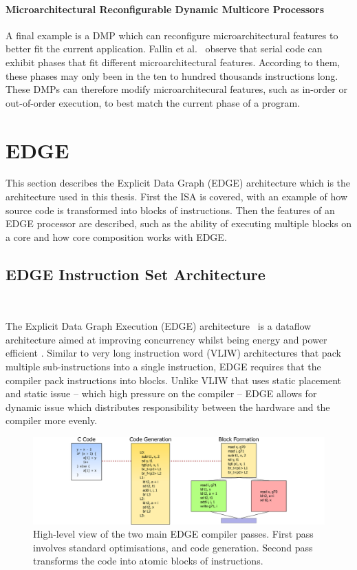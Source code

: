 \paragraph*{Microarchitectural Reconfigurable Dynamic Multicore Processors}
A final example is a DMP which can reconfigure microarchitectural features to better fit the current application.
Fallin et al.~\cite{fallinhetblock2014} observe that serial code can exhibit phases that fit different microarchitectural features.
According to them, these phases may only been in the ten to hundred thousands instructions long.
These DMPs can therefore modify microarchitecural features, such as in-order or out-of-order execution, to best match the current phase of a program.

\section{EDGE}\label{chp:bg:sec:edge}

This section describes the Explicit Data Graph (EDGE) architecture which is the architecture used in this thesis.
First the ISA is covered, with an example of how source code is transformed into blocks of instructions.
Then the features of an EDGE processor are described, such as the ability of executing multiple blocks on a core and how core composition works with EDGE.

\subsection{EDGE Instruction Set Architecture}~\label{sec:edge_isa}

The Explicit Data Graph Execution (EDGE) architecture~\cite{burger04edge} is a dataflow architecture aimed at improving concurrency whilst being energy and power efficient \cite{smith2006edge,burger04edge}.
Similar to very long instruction word (VLIW) architectures that pack multiple sub-instructions into a single instruction, EDGE requires that the compiler pack instructions into blocks.
Unlike VLIW that uses static placement and static issue -- which high pressure on the compiler -- EDGE allows for dynamic issue which distributes responsibility between the hardware and the compiler more evenly.

\begin{figure}[t]
    \centering
    \includegraphics[width=1\textwidth]{background/graphics/EDGE_4.pdf}
    \caption{High-level view of the two main EDGE compiler passes. First pass involves standard optimisations, and code generation. Second pass transforms the code into atomic blocks of instructions.}
    \label{fig:EdgeHigh}
\end{figure}
